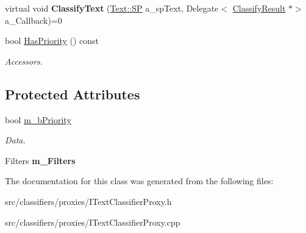 \begin{DoxyCompactItemize}
virtual void {\bfseries Classify\+Text} (\hyperlink{class_text_a35ce88bdca4f380b865b6066079230b1}{Text\+::\+SP} a\+\_\+sp\+Text, Delegate$<$ \hyperlink{struct_i_text_classifier_proxy_1_1_classify_result}{Classify\+Result} $\ast$$>$ a\+\_\+\+Callback)=0
\item 
\mbox{\label{class_i_text_classifier_proxy_ac669af3b2d8d7021ed6bd16e439d2116}} 
bool \hyperlink{class_i_text_classifier_proxy_ac669af3b2d8d7021ed6bd16e439d2116}{Has\+Priority} () const
\begin{DoxyCompactList}\small\item\em Accessors. \end{DoxyCompactList}\end{DoxyCompactItemize}
\subsection*{Protected Attributes}
\begin{DoxyCompactItemize}
\item 
\mbox{\label{class_i_text_classifier_proxy_a7d120b71e9f4ee51334196b376324e15}} 
bool \hyperlink{class_i_text_classifier_proxy_a7d120b71e9f4ee51334196b376324e15}{m\+\_\+b\+Priority}
\begin{DoxyCompactList}\small\item\em Data. \end{DoxyCompactList}\item 
\mbox{\label{class_i_text_classifier_proxy_a9c03c59ee1349f0b1ba752d0f04eeed4}} 
Filters {\bfseries m\+\_\+\+Filters}
\end{DoxyCompactItemize}


The documentation for this class was generated from the following files\+:\begin{DoxyCompactItemize}
\item 
src/classifiers/proxies/I\+Text\+Classifier\+Proxy.\+h\item 
src/classifiers/proxies/I\+Text\+Classifier\+Proxy.\+cpp\end{DoxyCompactItemize}
